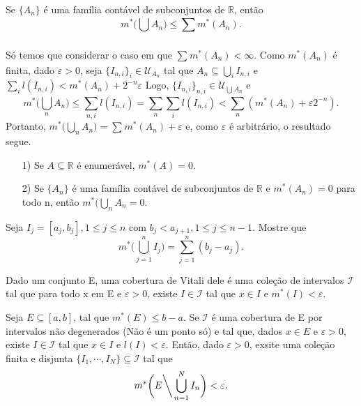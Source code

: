 \documentclass[Analysis/analysis_notes.tex]{subfiles}
\begin{document}
\begin{lemma*}
	Se \(\{A_{n}\}\) é uma família contável de subconjuntos de \(\mathbb{R}\), então
	\[
		m^{*}\biggl(\bigcup_{}^{}{A_{n}}\biggr)\leq \sum\limits_{}^{}m^{*}(A_{n}).
	\]
\end{lemma*}
\begin{proof*}
	Só temos que considerar o caso em que \(\sum\limits_{}^{}m^{*}(A_{n}) < \infty.\) Como
	\(m^{*}(A_{n})\) é finita, dado \(\varepsilon  > 0\), seja \(\{I_{n, i}\}_{i}\in \mathcal{U}_{A_{n}}\) tal que
	\(A_{n}\subseteq{\bigcup_{i}^{}{I_{n, i}}}\) e \(\sum\limits_{i}^{}l(I_{n, i}) < m^{*}(A_{n}) + 2^{-n}\varepsilon\)
	Logo, \(\{I_{n, i}\}_{n, i}\in \mathcal{U}_{\bigcup_{}^{}{A_{n}}}\) e
	\[
		m^{*}\biggl(\bigcup_{n}^{}{A_{n}}\biggr)\leq \sum\limits_{n, i}^{}l(I_{n, i}) = \sum\limits_{n}^{}\sum\limits_{i}^{}l(I_{n, i}) < \sum\limits_{n}^{}(m^{*}(A_{n}) + \varepsilon 2^{-n}).
	\]
	Portanto, \(m^{*}\biggl(\bigcup_{n}^{}{A_{n}}\biggr) = \sum\limits_{}^{}m^{*}(A_{n}) + \varepsilon\) e, como \(\varepsilon \) é arbitrário, o resultado segue.
\end{proof*}
\begin{crl*}
	\begin{itemize}
		\item[1)] Se \(A\subseteq{\mathbb{R}}\) é enumerável, \(m^{*}(A) = 0.\)
		\item[2)] Se \(\{A_{n}\}\) é uma família contável de subconjuntos de \(\mathbb{R}\) e
		      \(m^{*}(A_{n}) = 0\) para todo n, então \(m^{*}(\bigcup_{n}^{}A_{n} = 0.\)
	\end{itemize}
\end{crl*}
\begin{example}
	Seja \(I_{j} = [a_{j}, b_{j}], 1\leq j\leq n\) com \(b_{j} < a_{j+1}, 1\leq j\leq n-1.\) Mostre que
	\[
		m^{*}\biggl(\bigcup_{j=1}^{n}{I_{j}}\biggr) = \sum\limits_{j=1}^{n}(b_{j}-a_{j}).
	\]
\end{example}
Dado um conjunto E, uma cobertura de Vitali dele é uma cole\c cão de intervalos
\(\mathcal{I}\) tal que para todo x em E e \(\varepsilon  > 0\), existe \(I\in \mathcal{I}\) tal que
\(x\in I\) e \(m^{*}(I) < \varepsilon .\)
\hypertarget{vitali_covering}{
	\begin{lemma*}
		Seja \(E\subseteq{[a, b]}\), tal que \(m^{*}(E)\leq b-a.\) Se \(\mathcal{I}\)
		é uma cobertura de E por intervalos não degenerados (Não é um ponto só) e tal que, dados \(x\in E\) e
		\(\varepsilon >0\), existe \(I\in \mathcal{I}\) tal que \(x\in I\) e \(l(I) < \varepsilon .\)
		Então, dado \(\varepsilon  > 0\), exsite uma cole\c cão finita e disjunta \(\{I_{1}, \cdots, I_{N}\}\subseteq{\mathcal{I}}\)
		tal que
		\[
			m^{*}\biggl(E\biggl\backslash\biggr. \bigcup_{n=1}^{N}{I_{n}}\biggr) < \varepsilon .
		\]
	\end{lemma*}}
\end{document}
